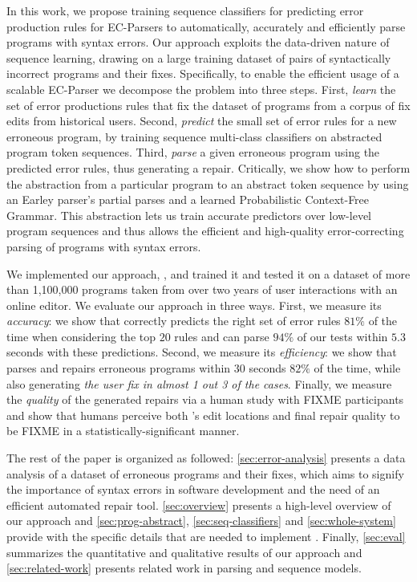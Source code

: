 In this work, we propose training sequence classifiers for predicting
error
production rules for EC-Parsers to automatically, accurately and
efficiently parse programs with syntax errors. Our approach exploits the data-driven
nature of sequence learning, drawing on a large training dataset of pairs
of syntactically incorrect programs and their fixes.
%
Specifically, to enable the efficient usage of a scalable EC-Parser we decompose
the problem into three steps.
%
First, \emph{learn} the set of error productions rules that fix the dataset of
programs from a corpus of fix edits from historical users.
%
Second, \emph{predict} the small set of error rules for a new erroneous program,
by training sequence multi-class classifiers on abstracted program token
sequences.
%
Third, \emph{parse} a given erroneous program using the predicted error rules,
thus generating a repair.
%
Critically, we show how to perform the abstraction from a particular
program to an abstract token sequence by using an Earley parser's
\citep{Earley_1970} partial parses and a learned Probabilistic Context-Free
Grammar. This abstraction lets us train accurate predictors over low-level
program sequences and thus allows the efficient and high-quality
error-correcting parsing of programs with syntax errors.

We implemented our approach, \toolname, and trained it and tested it on a
dataset of more than 1,100,000 programs taken from over two years of user
interactions with an online editor. We evaluate our approach in three ways.
%
First, we measure its \emph{accuracy}: we show that \toolname correctly predicts
the right set of error rules $81\%$ of the time when considering the top $20$
rules and can parse $94\%$ of our tests within $5.3$ seconds with these
predictions.
%
Second, we measure its \emph{efficiency}: we show that \toolname
parses and repairs erroneous programs within $30$ seconds $82\%$ of the time,
while also generating \emph{the user fix in almost 1 out 3 of the cases}.
%
Finally, we measure the \emph{quality} of the generated repairs via a human study
with FIXME participants and show that humans perceive both \toolname's edit
locations and final repair quality to be FIXME in a statistically-significant manner.


The rest of the paper is organized as followed: \autoref{sec:error-analysis}
presents a data analysis of a \python dataset of erroneous programs and their
fixes, which aims to signify the importance of syntax errors in software
development and the need of an efficient automated repair tool.
\autoref{sec:overview} presents a high-level overview of our approach and
\autoref{sec:prog-abstract}, \autoref{sec:seq-classifiers} and
\autoref{sec:whole-system} provide with the specific details that are needed to
implement \toolname. Finally, \autoref{sec:eval} summarizes the quantitative and
qualitative results of our approach and \autoref{sec:related-work} presents
related work in parsing and sequence models.
